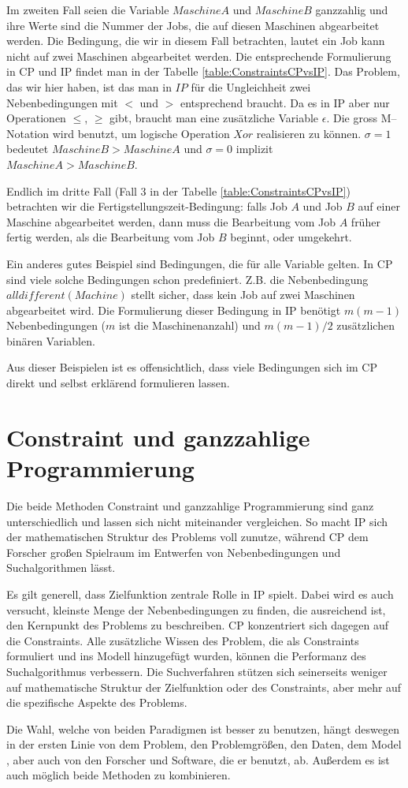 Im zweiten Fall seien die Variable $MaschineA$ und $MaschineB$ ganzzahlig und ihre Werte sind die Nummer der Jobs, die auf diesen Maschinen abgearbeitet werden. Die Bedingung, die wir in diesem Fall betrachten, lautet \glqq ein Job  kann nicht auf zwei Maschinen abgearbeitet werden\grqq. Die entsprechende Formulierung in CP und IP findet man in der Tabelle \ref{table:ConstraintsCPvsIP}. Das Problem, das wir hier haben, ist das man in $IP$ für die Ungleichheit zwei Nebenbedingungen mit $<$ und $>$ entsprechend braucht. Da es in IP aber nur Operationen $\le$, $\ge$ gibt, braucht man eine zusätzliche Variable $\epsilon$. Die \glqq gross M\grqq --Notation wird benutzt, um logische Operation $Xor$ realisieren zu können. $\sigma =1$ bedeutet $MaschineB>MaschineA$ und $\sigma =0$ implizit $MaschineA>MaschineB$.

Endlich im dritte Fall (Fall $3$ in der Tabelle \ref{table:ConstraintsCPvsIP}) betrachten wir die Fertigstellungszeit-Bedingung: falls Job $A$ und Job $B$ auf einer Maschine abgearbeitet werden, dann muss die Bearbeitung vom Job $A$ früher fertig werden, als die Bearbeitung vom Job $B$ beginnt, oder umgekehrt. 

Ein anderes gutes Beispiel sind Bedingungen, die für alle Variable gelten. In CP sind viele solche Bedingungen schon predefiniert. Z.B. die Nebenbedingung $alldifferent(Machine)$ stellt sicher, dass kein Job auf zwei Maschinen abgearbeitet wird. Die Formulierung dieser Bedingung in IP benötigt $m(m-1)$ Nebenbedingungen ($m$ ist die Maschinenanzahl) und $m(m-1)/2$ zusätzlichen binären Variablen.

Aus dieser Beispielen ist es offensichtlich, dass viele Bedingungen sich im CP direkt und selbst erklärend formulieren lassen.

\section{Constraint und ganzzahlige Programmierung}

Die beide Methoden Constraint und  ganzzahlige Programmierung sind ganz unterschiedlich und lassen sich nicht miteinander vergleichen. 
So macht IP sich der mathematischen Struktur des Problems voll zunutze, während CP dem Forscher großen Spielraum im Entwerfen von Nebenbedingungen und Suchalgorithmen lässt.

Es gilt generell, dass Zielfunktion zentrale Rolle in IP spielt. Dabei wird es auch versucht, kleinste Menge der Nebenbedingungen zu finden, die ausreichend ist, den Kernpunkt des Problems zu beschreiben. CP konzentriert sich dagegen auf die Constraints. Alle zusätzliche Wissen des Problem, die als Constraints formuliert und ins Modell hinzugefügt wurden, können die Performanz des Suchalgorithmus verbessern. Die Suchverfahren stützen sich seinerseits weniger auf mathematische Struktur der Zielfunktion oder des Constraints, aber mehr auf die spezifische Aspekte des Problems.

Die Wahl, welche von beiden Paradigmen ist besser zu benutzen, hängt deswegen in der ersten Linie von dem Problem, den Problemgrößen, den Daten, dem Model , aber auch von den Forscher und Software, die er benutzt, ab. Außerdem es ist auch möglich beide Methoden zu kombinieren.



